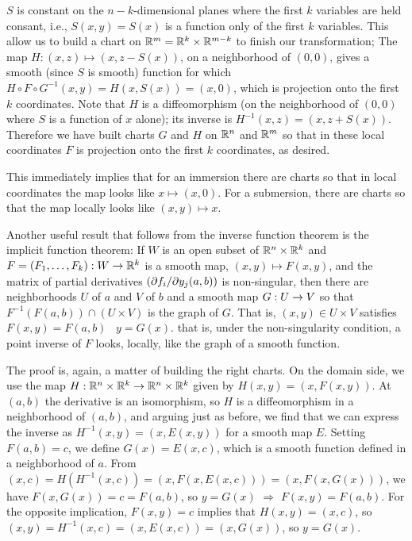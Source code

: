 $S$ is constant on the $n-k$-dimensional planes where the first $k$ variables are held consant,
i.e., $S(x,y)=S(x)$ is a function only of the first $k$ variables. This allow us to build a
chart on ${\Bbb R}^m={\Bbb R}^k\times {\Bbb R}^{m-k}$ to finish our transformation; The map
$H:(x,z)\mapsto (x,z-S(x))$, on a neighborhood of $(0,0)$, gives a smooth (since $S$ is smooth)
function for which $H\circ F\circ G^{-1}(x,y)=H(x,S(x))=(x,0)$,
which is projection onto the first $k$ coordinates. Note that $H$ is a diffeomorphism
(on the neighborhood of $(0,0)$ where $S$ is a function of $x$ alone); its inverse is
$H^{-1}(x,z)=(x,z+S(x))$. Therefore we have built charts $G$ and $H$ on ${\Bbb R}^n$ and ${\Bbb R}^m$
so that in these local coordinates $F$ is projection onto the first $k$ coordinates, as desired.

\ssk

This immediately implies that for an immersion there are charts so that in local coordinates
the map looks like $x\mapsto (x,0)$. For a submersion, there are charts so that the map locally
looks like $(x,y)\mapsto x$.

\msk

Another useful result that follows from the inverse function theorem is the implicit function
theorem: If $W$ is an open subset of ${\Bbb R}^n\times {\Bbb R}^k$ and $F=(F_1,\ldots,F_k):W\rightarrow {\Bbb R}^k$ is a smooth map,
$(x,y)\mapsto F(x,y)$, and the matrix of partial derivatives $(\partial f_i/\partial y_j(a,b))$ is non-singular,
then there are neighborhoods $U$ of $a$ and $V$ of $b$ and a smooth map $G:U\rightarrow V$ so that
$F^{-1}(F(a,b))\cap(U\times V)$ is the graph of $G$. That is, $(x,y)\in U\times V$ satisfies $F(x,y)=F(a,b)$
\lra\ $y=G(x)$. that is, under the non-singularity condition, a point inverse of $F$ looks, locally, like the
graph of a smooth function.

\ssk

The proof is, again, a matter of building the right charts. On the domain side, we use
the map $H:{\Bbb R}^n\times {\Bbb R}^k\rightarrow {\Bbb R}^n\times {\Bbb R}^k$ given by $H(x,y)=(x,F(x,y))$.
At $(a,b)$ the derivative is an isomorphism, so $H$ is a diffeomorphism in a neighborhood
of $(a,b)$, and arguing just as before, we find that we can express the inverse as
$H^{-1}(x,y)=(x,E(x,y))$ for a smooth map $E$. Setting $F(a,b)=c$, we define
$G(x)=E(x,c)$, which is a smooth function defined in a neighborhood of $a$. From 
$(x,c)=H(H^{-1}(x,c))=(x,F(x,E(x,c)))=(x,F(x,G(x)))$, we have $F(x,G(x))=c=F(a,b)$, 
so $y=G(x)$ $\Rightarrow$ $F(x,y)=F(a,b)$. For the opposite implication, 
$F(x,y)=c$ implies that $H(x,y)=(x,c)$, so $(x,y)=H^{-1}(x,c)=(x,E(x,c))=(x,G(x))$, so $y=G(x)$.

